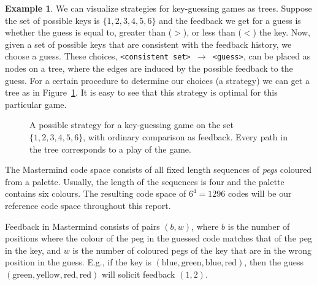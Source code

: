 \documentclass[a4paper]{article}
\theoremstyle{definition}
\newtheorem{example}{Example}
\begin{document}
\begin{example}
\label{ex:binary}
We can visualize strategies for key-guessing games as trees.
Suppose the set of possible keys is $\{1, 2, 3, 4, 5, 6\}$ and the feedback we get for a guess is whether the guess is equal to, greater than ($>$), or less than ($<$) the key.
Now, given a set of possible keys that are consistent with the feedback history, we choose a guess.
These choices, \texttt{<consistent set> $\to$ <guess>}, can be placed as nodes on a tree, where the edges are induced by the possible feedback to the guess.
For a certain procedure to determine our choices (a strategy) we can get a tree as in Figure~\ref{fig:binary}.
It is easy to see that this strategy is optimal for this particular game.

\begin{figure}
\begin{center}
\end{center}
\caption{
  A possible strategy for a key-guessing game on the set $\{1, 2, 3, 4, 5, 6\}$, with ordinary comparison as feedback.
  Every path in the tree corresponds to a play of the game.
}
\label{fig:binary}
\end{figure}
\end{example}

The Mastermind code space consists of all fixed length sequences of \emph{pegs} coloured from a palette.
Usually, the length of the sequences is four and the palette contains six colours.
The resulting code space of $6^4 = 1296$ codes will be our reference code space throughout this report.

Feedback in Mastermind consists of pairs $(b, w)$, where $b$ is the number of positions where the colour of the peg in the guessed code matches that of the peg in the key, and $w$ is the number of coloured pegs of the key that are in the wrong position in the guess.
E.g., if the key is $(\text{blue}, \text{green}, \text{blue}, \text{red})$, then the guess $(\text{green}, \text{yellow}, \text{red}, \text{red})$ will solicit feedback $(1, 2)$.
\end{document}
